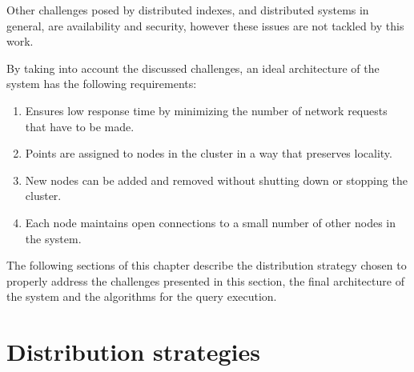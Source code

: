 \documentclass[11pt,a4paper]{globis-book}
\begin{document}
\begin{itemize}
\end{itemize}

Other challenges posed by distributed indexes, and distributed systems in general, are availability and security, however these issues are not tackled by this work.

By taking into account the discussed challenges, an ideal architecture of the system has the following requirements:
\begin{enumerate}
    \item Ensures low response time by minimizing the number of network requests that have to be made.        
    \item Points are assigned to nodes in the cluster in a way that preserves locality.
    \item New nodes can be added and removed without shutting down or stopping the cluster.
    \item Each node maintains open connections to a small number of other nodes in the system.
\end{enumerate}

The following sections of this chapter describe the distribution strategy chosen to properly address the challenges presented in this section, the final architecture of the system and the algorithms for the query execution.

\section{Distribution strategies}
\label{sec:distindex-strategies}
\end{document}
